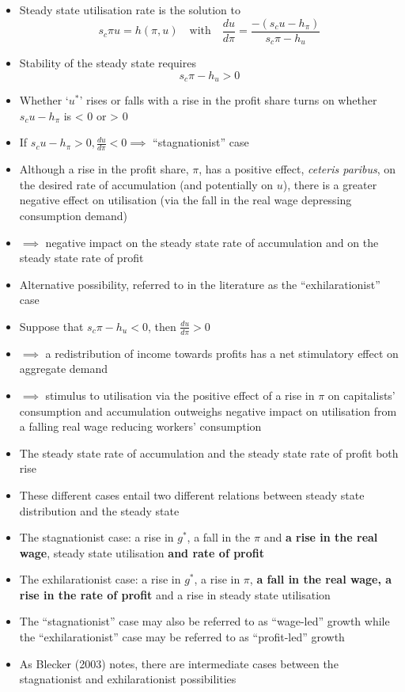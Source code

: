 \documentclass{article}
\begin{document}
\begin{itemize}
		\item  Steady state utilisation rate is the solution to
		\begin{equation}
			s_c\pi u = h(\pi,u) \quad\text{with}\quad \frac{du}{d\pi} = \frac{-\left( s_cu-h_{\pi} \right)}{s_c\pi-h_u} \label{eq:4.33}
		\end{equation}
		\item Stability of the steady state requires
		\[
			s_c\pi-h_u>0
		\]
		\item Whether `\( u^* \)' rises or falls with a rise in the profit share turns on whether \( s_c u-h_{\pi} \) is < 0 or > 0
		\item If \( s_c u-h_{\pi} > 0, \frac{du}{d\pi}<0 \implies \) ``stagnationist'' case
		\item Although a rise in the profit share, \( \pi \), has a positive effect, \textit{ceteris paribus}, on the desired rate of accumulation (and potentially on \( u \)), there is a greater negative effect on utilisation (via the fall in the real wage depressing consumption demand)
		\item \( \implies \) negative impact on the steady state rate of accumulation and on the steady state rate of profit
		\item Alternative possibility, referred to in the literature as the ``exhilarationist'' case
		\item Suppose that \( s_c\pi-h_u<0 \), then \( \frac{du}{d\pi}>0 \)
		\item \( \implies \) a redistribution of income towards profits has a net stimulatory effect on aggregate demand
		\item \( \implies \) stimulus to utilisation via the positive effect of a rise in \( \pi \) on capitalists' consumption and accumulation outweighs negative impact on utilisation from a falling real wage reducing workers' consumption
		\item The steady state rate of accumulation and the steady state rate of profit both rise
		\item These different cases entail two different relations between steady state distribution and the steady state
		\item The stagnationist case: a rise in \( g^* \), a fall in the \( \pi \) and \textbf{a rise in the real wage}, steady state utilisation \textbf{and rate of profit}
		\item The exhilarationist case: a rise in \( g^* \), a rise in \( \pi \), \textbf{a fall in the real wage, a rise in the rate of profit} and a rise in steady state utilisation
		\item The ``stagnationist'' case may also be referred to as ``wage-led'' growth while the ``exhilarationist'' case may be referred to as ``profit-led'' growth
		\item As Blecker (2003) notes, there are intermediate cases between the stagnationist and exhilarationist possibilities 
	\end{itemize}
\end{document}
